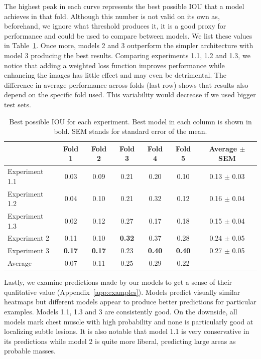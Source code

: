 The highest peak in each curve represents the best possible IOU that a model achieves in that fold. Although this number is not valid on its own as, beforehand, we ignore what threshold produces it, it is a good proxy for performance and could be used to compare between models. We list these values in Table~\ref{tab:PeakIOUResults}. Once more, models 2 and 3 outperform the simpler architecture with model 3 producing the best results. Comparing experiments 1.1, 1.2 and 1.3, we notice that adding a weighted loss function improves performance while enhancing the images has little effect and may even be detrimental.
The difference in average performance across folds (last row) shows that results also depend on the specific fold used. 
This variability would decrease if we used bigger test sets.
\begin{table}[h]
	\centering
	\begin{tabular}{l*{6}{c}}
		\hline
		 & \textbf{Fold 1} & \textbf{Fold 2} & \textbf{Fold 3} &\textbf{Fold 4} &\textbf{Fold 5} & \textbf{Average $\pm$ SEM} \\
		\hline 
		Experiment 1.1	&0.03	&0.09	&0.21	&0.20	&0.10	&0.13 $\pm$ 0.03\\
		Experiment 1.2	&0.04	&0.10	&0.21	&0.32	&0.12	&0.16 $\pm$ 0.04\\
		Experiment 1.3	&0.02	&0.12	&0.27	&0.17	&0.18	&0.15 $\pm$ 0.04\\
		Experiment 2	&0.11 	&0.10	&\textbf{0.32}	&0.37	&0.28	&0.24 $\pm$ 0.05\\
		Experiment 3	&\textbf{0.17}	&\textbf{0.17}	&0.23	&\textbf{0.40}	&\textbf{0.40}	&0.27 $\pm$ 0.05\\
		Average			&0.07		&0.11	&0.25	&0.29	&0.22 &\\
		\hline
	\end{tabular}
	\caption[Peak IOU values for the final models]{Best possible IOU for each experiment. Best model in each column is shown in bold. SEM stands for standard error of the mean.}
	\label{tab:PeakIOUResults}
\end{table}

Lastly, we examine predictions made by our models to get a sense of their qualitative value (Appendix~\ref{app:examples}).
Models predict visually similar heatmaps but different models appear to produce better predictions for particular examples. Models 1.1, 1.3 and 3 are consistently good. On the downside, all models mark chest muscle with high probability and none is particularly good at localizing subtle lesions. It is also notable that model 1.1 is very conservative in its predictions while model 2 is quite more liberal, predicting large areas as probable masses.

